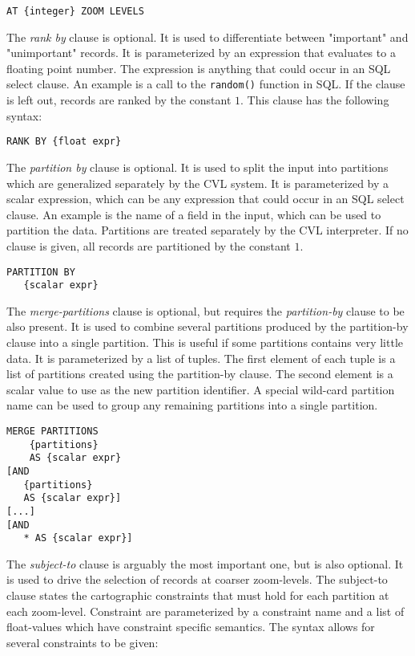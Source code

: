 \begin{lstlisting}
AT {integer} ZOOM LEVELS
\end{lstlisting}

The \emph{rank by} clause is optional. It is used to differentiate between "important" and "unimportant" records. It is parameterized by an expression that evaluates to a floating point number. The expression is anything that could occur in an SQL select clause. An example is a call to the \texttt{random()} function in SQL. If the clause is left out, records are ranked by the constant $1$. This clause has the following syntax:

\begin{lstlisting}
RANK BY {float expr}
\end{lstlisting}

The \emph{partition by} clause is optional. It is used to split the input into partitions which are generalized separately by the CVL system. It is parameterized by a scalar expression, which can be any expression that could occur in an SQL select clause. An example is the name of a field in the input, which can be used to partition the data. Partitions are treated separately by the CVL interpreter. If no clause is given, all records are partitioned by the constant $1$. 

\begin{lstlisting}
PARTITION BY
   {scalar expr}
\end{lstlisting}

The \emph{merge-partitions} clause is optional, but requires the \emph{partition-by} clause to be also present. It is used to combine several partitions produced by the partition-by clause into a single partition. This is useful if some partitions contains very little data. It is parameterized by a list of tuples. The first element of each tuple is a list of partitions created using the partition-by clause. The second element is a scalar value to use as the new partition identifier. A special wild-card partition name can be used to group any remaining partitions into a single partition.

\begin{lstlisting}
MERGE PARTITIONS    
    {partitions}
    AS {scalar expr}
[AND 
   {partitions} 
   AS {scalar expr}]
[...]
[AND 
   * AS {scalar expr}]
\end{lstlisting}

The \emph{subject-to} clause is arguably the most important one, but is also optional. It is used to drive the selection of records at coarser zoom-levels. The subject-to clause states the cartographic constraints that must hold for each partition at each zoom-level. Constraint are parameterized by a constraint name and a list of float-values which have constraint specific semantics. The syntax allows for several constraints to be given:

